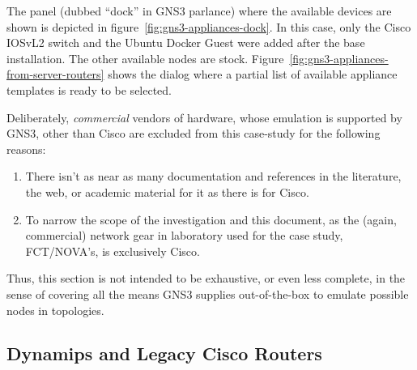 
The panel (dubbed ``dock'' in GNS3 parlance) where the available devices are shown is depicted in figure~\ref{fig:gns3-appliances-dock}.
In this case, only the Cisco IOSvL2 switch and the Ubuntu Docker Guest were added after the base installation.
The other available nodes are stock.
Figure~\ref{fig:gns3-appliances-from-server-routers} shows the dialog where a partial list of available appliance templates is ready to be selected.



Deliberately, \emph{commercial} vendors of hardware, whose emulation is supported by GNS3, other than Cisco are excluded from this case-study for the following reasons:

\begin{enumerate}
  \item There isn't as near as many documentation and references in the literature, the web, or academic material for it as there is for Cisco.
  \item To narrow the scope of the investigation and this document, as the (again, commercial) network gear in laboratory used for the case study, FCT/NOVA's, is exclusively Cisco.
\end{enumerate}

Thus, this section is not intended to be exhaustive, or even less complete, in the sense of covering all the means GNS3 supplies out-of-the-box to emulate possible nodes in topologies.

\subsection{Dynamips and Legacy Cisco Routers}
\label{subsec:gns3dynamipslegacy}

